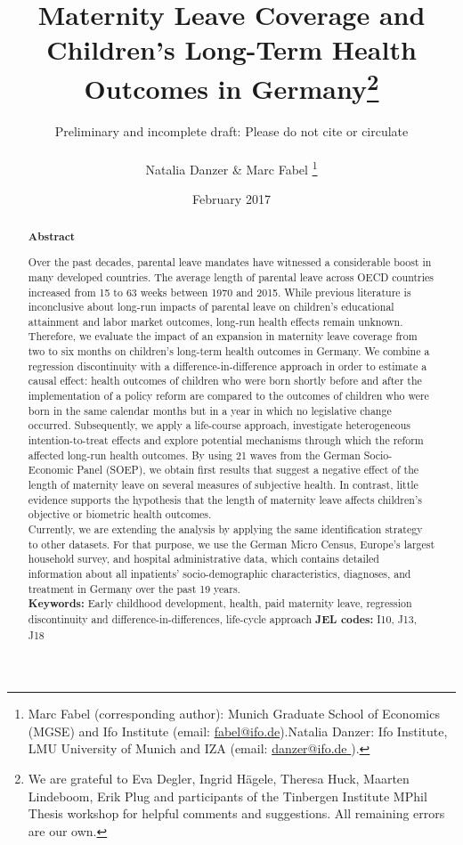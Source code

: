 \documentclass[a4paper ]{article}
\title{Maternity Leave Coverage and Children's Long-Term Health Outcomes in Germany\footnote{We are grateful to Eva Degler, Ingrid H\"agele, Theresa Huck, Maarten Lindeboom, Erik Plug and participants of the Tinbergen Institute MPhil Thesis workshop for helpful comments and suggestions. All remaining errors are our own.}
}
\author{{\color{red}Preliminary and incomplete draft: Please do not cite or circulate}\\ \\
Natalia Danzer \& Marc Fabel \thanks{Marc Fabel (corresponding author): Munich Graduate School of Economics (MGSE) and Ifo Institute (email: \href{mailto:fabel@ifo.de}{fabel@ifo.de}).\newline Natalia Danzer: Ifo Institute,
LMU University of Munich and IZA (email: \href{mailto:danzer@ifo.de }{danzer@ifo.de }).}}
\date{February 2017}
\renewcommand{\headrulewidth}{0.5pt}
\begin{document}
\thispagestyle{empty}\fancyhf{}
\rhead{}
\renewcommand{\headrulewidth}{0.5pt}



%

\newpage

\clearpage
\setcounter{page}{1}    
\rhead{\thepage}

        \newpage

\renewcommand{\abstractname}{\vspace{-\baselineskip}}	%
\maketitle
    \begin{abstract}\noindent 
   \footnotesize{\begin{center}\textbf{Abstract}\end{center} Over the past decades, parental leave mandates have witnessed a considerable boost in many developed countries. The average length of parental leave across OECD countries increased from 15 to 63 weeks between 1970 and 2015. While previous literature is inconclusive about long-run impacts of parental leave on children's educational attainment and labor market outcomes, long-run health effects remain unknown. Therefore, we evaluate the impact of an expansion in maternity leave coverage from two to six months on children's long-term health outcomes in Germany. We combine a regression discontinuity with a difference-in-difference approach in order to estimate a causal effect: health outcomes of children who were born shortly before and after the implementation of a policy reform are compared to the outcomes of children who were born in the same calendar months but in a year in which no legislative change occurred. Subsequently, we apply a life-course approach, investigate heterogeneous intention-to-treat effects and explore potential mechanisms through which the reform affected long-run health outcomes. By using 21 waves from the German Socio-Economic Panel (SOEP), we obtain first results that suggest a negative effect of the length of maternity leave on several measures of subjective health. In contrast, little evidence supports the hypothesis that the length of maternity leave affects children's objective or biometric health outcomes.\newline\\ Currently, we are extending the analysis by applying the same identification strategy to other datasets. For that purpose, we use the German Micro Census, Europe's largest household survey, and hospital administrative data, which contains detailed information about all inpatients' socio-demographic characteristics, diagnoses, and treatment in Germany over the past 19 years.%
   \\\newline \textbf{Keywords:} Early childhood development, health, paid maternity leave, regression discontinuity and difference-in-differences, life-cycle approach \newline \textbf{JEL codes:} I10, J13, J18}
    \end{abstract}
    
\end{document}
